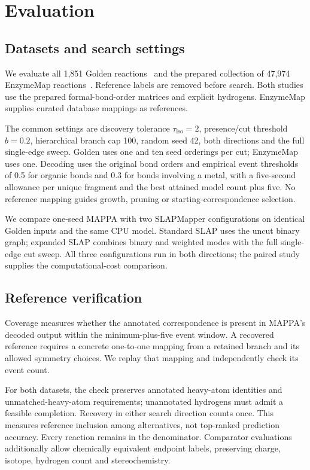 \FloatBarrier
\section{Evaluation}

\subsection{Datasets and search settings}
\label{sec:current-validation}

We evaluate all 1,851 Golden reactions~\citep{lin2022} and the prepared collection of 47,974 EnzymeMap reactions~\citep{heid2023enzymemap}. Reference labels are removed before search. Both studies use the prepared formal-bond-order matrices and explicit hydrogens. EnzymeMap supplies curated database mappings as references.

The common settings are discovery tolerance $\tau_{\mathrm{iso}}=2$, presence/cut threshold $b=0.2$, hierarchical branch cap 100, random seed 42, both directions and the full single-edge sweep. Golden uses one and ten seed orderings per cut; EnzymeMap uses one. Decoding uses the original bond orders and empirical event thresholds of 0.5 for organic bonds and 0.3 for bonds involving a metal, with a five-second allowance per unique fragment and the best attained model count plus five. No reference mapping guides growth, pruning or starting-correspondence selection.

We compare one-seed MAPPA with two SLAPMapper configurations on identical Golden inputs and the same CPU model. Standard SLAP uses the uncut binary graph; expanded SLAP combines binary and weighted modes with the full single-edge cut sweep. All three configurations run in both directions; the paired study supplies the computational-cost comparison.

\subsection{Reference verification}
\label{sec:verification}

Coverage measures whether the annotated correspondence is present in MAPPA's decoded output within the minimum-plus-five event window. A recovered reference requires a concrete one-to-one mapping from a retained branch and its allowed symmetry choices. We replay that mapping and independently check its event count.

For both datasets, the check preserves annotated heavy-atom identities and unmatched-heavy-atom requirements; unannotated hydrogens must admit a feasible completion. Recovery in either search direction counts once. This measures reference inclusion among alternatives, not top-ranked prediction accuracy. Every reaction remains in the denominator. Comparator evaluations additionally allow chemically equivalent endpoint labels, preserving charge, isotope, hydrogen count and stereochemistry.

